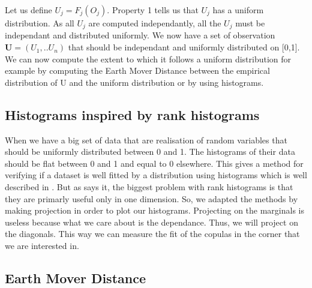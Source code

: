 \documentclass{article}
\begin{document}
   Let us define \begin{math}U_j = F_{j}(O_{j})\end{math}. Property 1 tells us that \begin{math} U_j\end{math} has a uniform distribution. As all \begin{math}U_j\end{math} are computed independantly, all the \begin{math}U_j\end{math} must be independant and distributed uniformly.\newline
   \newline
   We now have a set of observation \begin{math} \textbf{U} = (U_1,..U_n)\end{math} that should be independant and uniformly distributed on [0,1]. We can now compute the extent to which it follows a uniform distribution for example by computing the Earth Mover Distance between the empirical distribution of U and the uniform distribution or by using histograms.
    
	\subsection{Histograms inspired by rank histograms}   
   
  
   When we have a big set of data that are realisation of random variables that should be uniformly distributed between 0 and 1. The histograms of their data should be flat between 0 and 1 and equal to 0 elsewhere. This gives a method for verifying if a dataset is well fitted by a distribution using histograms which is well described in \cite{hamill2000}. But as \cite{hamill2000} says it, the biggest problem with rank histograms is that they are primarly useful only in one dimension. So, we adapted the methods by making projection in order to plot our histograms. Projecting on the marginals is useless because what we care about is the dependance. Thus, we will project on the diagonals. This way we can measure the fit of the copulas in the corner that we are interested in.
   
   
	\subsection{Earth Mover Distance}
\end{document}
